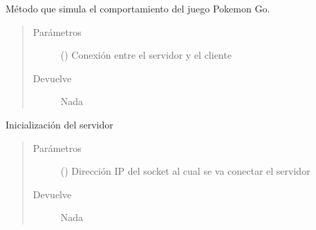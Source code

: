 \documentclass[letterpaper,10pt,spanish,openany,oneside]{sphinxmanual}
\begin{document}

\begin{fulllineitems}
\label{\detokenize{pokemonServer:pokemonServer.playPokemonGo}}
Método que simula el comportamiento del juego Pokemon Go.
\begin{quote}\begin{description}
\item[{Parámetros}] \leavevmode
{} () \textendash{} Conexión entre el servidor y el cliente

\item[{Devuelve}] \leavevmode
Nada

\end{description}\end{quote}

\end{fulllineitems}


\begin{fulllineitems}
\label{\detokenize{pokemonServer:pokemonServer.start_server}}
Inicialización del servidor
\begin{quote}\begin{description}
\item[{Parámetros}] \leavevmode
{} () \textendash{} Dirección IP del socket al cual se va conectar el servidor

\item[{Devuelve}] \leavevmode
Nada

\end{description}\end{quote}

\end{fulllineitems}

\end{document}
